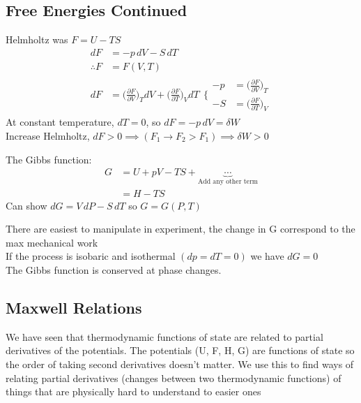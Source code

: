 \documentclass[a4paper, 11pt, normalem]{report}
\newcommand\p{\partial}
\begin{document}
\chapter{}
\section{Free Energies Continued}
Helmholtz was $F = U - TS$
\begin{align*}
    dF &= -p\,dV - S\,dT \\
    \therefore F &= F(V,T) \\
    dF &= \Big(\frac{\p F}{\p V}\Big)_T dV + \Big(\frac{\p F}{\p T}\Big)_V dT
    ~~\Bigg\{ \begin{aligned}
                -p &= \Big(\frac{\p F}{\p V}\Big)_T \\
                -S &= \Big(\frac{\p F}{\p T}\Big)_V
            \end{aligned}
\end{align*}
At constant temperature, $dT = 0$, so $dF = -p\,dV = \delta W$ \\
Increase Helmholtz, $dF > 0 \implies (F_1 \to F_2 > F_1) \implies \delta W > 0$

The Gibbs function:
\begin{align*}
    G &= U + pV - TS + \underbrace{\cdots}_{\text{Add any other term}} \\
    &= H - TS
\end{align*}
Can show $dG = V\,dP - S\,dT$ so $G = G(P, T)$

There are easiest to manipulate in experiment, the change in G correspond to the max mechanical work \\
If the process is isobaric and isothermal $(dp = dT = 0)$ we have $dG = 0$ \\
The Gibbs function is conserved at phase changes.

\section{Maxwell Relations}
We have seen that thermodynamic functions of state are related to partial derivatives of the potentials. The potentials (U, F, H, G) are functions of state so the order of taking second derivatives doesn't matter. We use this to find ways of relating partial derivatives (changes between two thermodynamic functions) of things that are physically hard to understand to easier ones
\end{document}

